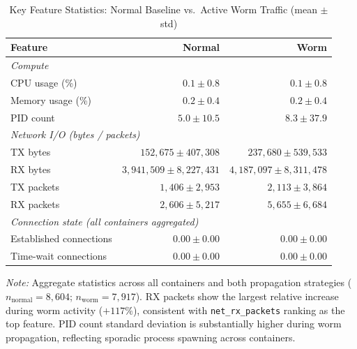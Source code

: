 \begin{table}[ht]
\centering
\caption{Key Feature Statistics: Normal Baseline vs.\ Active Worm Traffic (mean $\pm$ std)}
\label{tab:feature_stats}
\begin{tabular}{lrr}
\toprule
\textbf{Feature} & \textbf{Normal} & \textbf{Worm} \\
\midrule
\multicolumn{3}{l}{\textit{Compute}} \\
CPU usage (\%)           & $0.1 \pm 0.8$         & $0.1 \pm 0.8$ \\
Memory usage (\%)        & $0.2 \pm 0.4$         & $0.2 \pm 0.4$ \\
PID count                & $5.0 \pm 10.5$        & $8.3 \pm 37.9$ \\
\midrule
\multicolumn{3}{l}{\textit{Network I/O (bytes / packets)}} \\
TX bytes                 & $152{,}675 \pm 407{,}308$ & $237{,}680 \pm 539{,}533$ \\
RX bytes                 & $3{,}941{,}509 \pm 8{,}227{,}431$ & $4{,}187{,}097 \pm 8{,}311{,}478$ \\
TX packets               & $1{,}406 \pm 2{,}953$     & $2{,}113 \pm 3{,}864$ \\
RX packets               & $2{,}606 \pm 5{,}217$     & $5{,}655 \pm 6{,}684$ \\
\midrule
\multicolumn{3}{l}{\textit{Connection state (all containers aggregated)}} \\
Established connections  & $0.00 \pm 0.00$       & $0.00 \pm 0.00$ \\
Time-wait connections    & $0.00 \pm 0.00$       & $0.00 \pm 0.00$ \\
\bottomrule
\end{tabular}
\begin{minipage}{\linewidth}
\vspace{4pt}
\small
\textit{Note:} Aggregate statistics across all containers and both propagation strategies
($n_{\text{normal}} = 8{,}604$; $n_{\text{worm}} = 7{,}917$). RX packets show the
largest relative increase during worm activity ($+117\%$), consistent with
\texttt{net\_rx\_packets} ranking as the top feature. PID count standard deviation
is substantially higher during worm propagation, reflecting sporadic process spawning
across containers.
\end{minipage}
\end{table}


